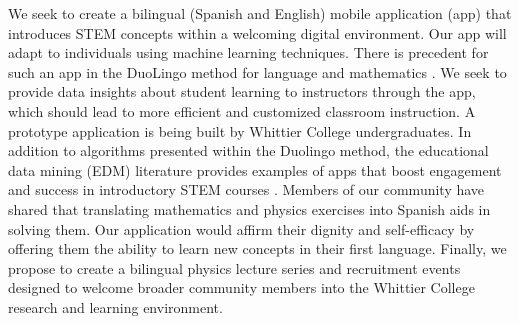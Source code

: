 \documentclass[../../main.tex]{subfiles}
\begin{document}
We seek to create a bilingual (Spanish and English) mobile application (app) that introduces STEM concepts within a welcoming digital environment.  Our app will adapt to individuals using machine learning techniques.  There is precedent for such an app in the DuoLingo method for language and mathematics \cite{duolingo_whitepaper}. We seek to provide data insights about student learning to instructors through the app, which should lead to more efficient and customized classroom instruction.  A prototype application is being built by Whittier College undergraduates.  In addition to algorithms presented within the Duolingo method, the educational data mining (EDM) literature provides examples of apps that boost engagement and success in introductory STEM courses \cite{edm1,edm2,edm3,edm4}.  Members of our community have shared that translating mathematics and physics exercises into Spanish aids in solving them.  Our application would affirm their dignity and self-efficacy by offering them the ability to learn new concepts in their first language.  Finally, we propose to create a bilingual physics lecture series and recruitment events designed to welcome broader community members into the Whittier College research and learning environment.

\clearpage
\end{document}

